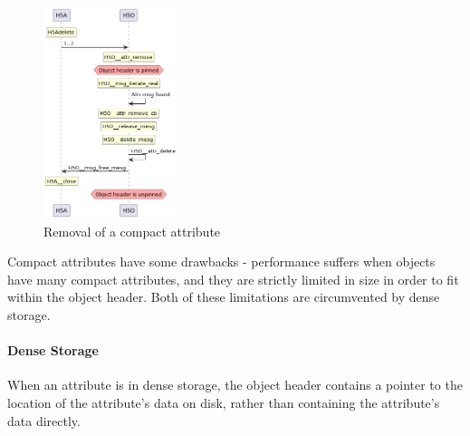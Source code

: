\begin{figure}
    \centering
    \includegraphics[width=0.35\textwidth]{images/tour_3_uml_attr_remove_compact.png}
    \caption{Removal of a compact attribute}
    \label{fig:tour-3-uml-attr-remove-compact}
\end{figure}

Compact attributes have some drawbacks - performance suffers when objects have many compact attributes, and they are strictly limited in size in order to fit within the object header.  Both of these limitations are circumvented by dense storage. 

\paragraph{Dense Storage} When an attribute is in dense storage, the object header contains a pointer to the location of the attribute's data on disk, rather than containing the attribute's data directly.

